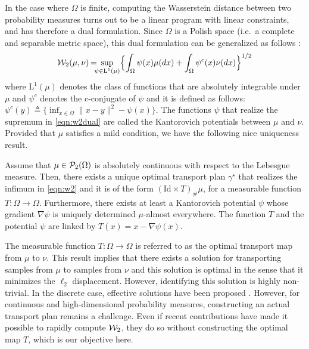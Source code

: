 In the case where $\Omega$ is finite, computing the Wasserstein distance between two probability measures turns out to be  a linear program with linear constraints, and has therefore a dual formulation. Since $\Omega$ is a Polish space (i.e.\ a complete and separable metric space), this dual formulation can be generalized as follows \cite[Theorem 5.10]{villani2008optimal}:
\begin{align}
{\cal W}_2(\mu,\nu) \hspace{-1pt} = \hspace{-6pt} \sup_{\psi \in \mathrm{L}^1(\mu)} \Bigl\{ \int_\Omega \psi(x) \mu(dx) + \int_\Omega \psi^c(x) \nu(dx) \Bigr\}^{1/2} \label{eqn:w2dual}
\end{align}
where $\mathrm{L}^1(\mu)$ denotes the class of functions that are absolutely integrable under $\mu$ and $\psi^c$ denotes the c-conjugate of $\psi$ and it is defined as follows: $\psi^c(y) \triangleq \{ \inf_{x\in \Omega} \| x-y\|^2 - \psi(x)\}$. The functions $\psi$ that realize the supremum in \eqref{eqn:w2dual} are called the Kantorovich potentials between $\mu$ and $\nu$.
%
Provided that $\mu$ satisfies a mild condition, we have the following nice uniqueness result.
\begin{thm}
\label{thm:unqmap}
Assume that  $\mu\in {\cal P}_2(\Omega)$ is absolutely continuous with respect to the Lebesgue measure. Then, there exists a unique optimal transport plan $\gamma^\star$ that realizes the infimum in \eqref{eqn:w2} and it is of the form $(\text{Id} \times T)_\# \mu$, for a measurable function $T : \Omega \to \Omega$. Furthermore, there exists at least a Kantorovich potential $\psi$ whose gradient $\nabla \psi$ is uniquely determined $\mu$-almost everywhere. The function $T$ and the potential $\psi$ are linked by $T(x) = x- \nabla \psi(x)$.
\end{thm}
The measurable function $T : \Omega \to \Omega$ is referred to as the optimal transport map from $\mu$ to $\nu$. 
This result implies that there exists a solution for transporting samples from $\mu$ to samples from $\nu$ and this solution is optimal in the sense that it minimizes the $\ell_2$ displacement. However, identifying this solution is highly non-trivial. In the discrete case, effective solutions have been proposed \cite{cuturi2013sinkhorn}. However, for continuous and high-dimensional probability measures, constructing an actual transport plan remains a challenge. Even if recent contributions \cite{genevay2016stochastic} have made it possible to rapidly compute ${\cal W}_2$, they do so without constructing the optimal map $T$, which is our objective here.


